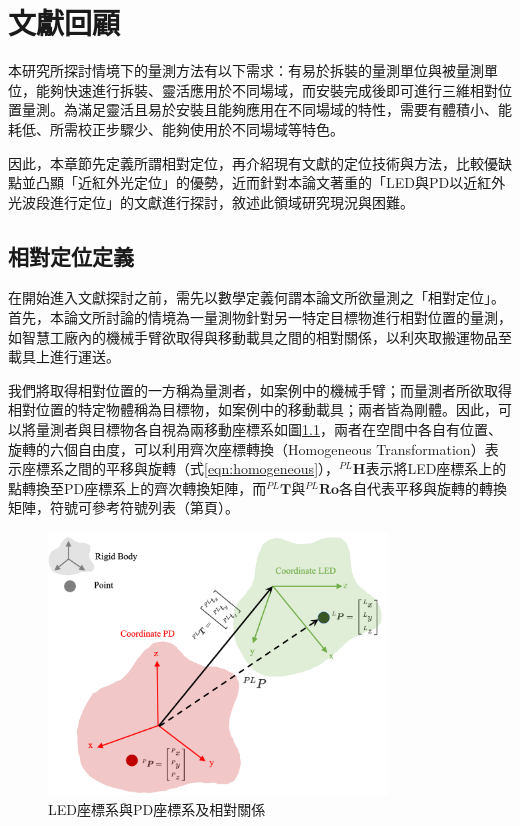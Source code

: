 \chapter{文獻回顧}







本研究所探討情境下的量測方法有以下需求：有易於拆裝的量測單位與被量測單位，能夠快速進行拆裝、靈活應用於不同場域，而安裝完成後即可進行三維相對位置量測。為滿足靈活且易於安裝且能夠應用在不同場域的特性，需要有體積小、能耗低、所需校正步驟少、能夠使用於不同場域等特色。

因此，本章節先定義所謂相對定位，再介紹現有文獻的定位技術與方法，比較優缺點並凸顯「近紅外光定位」的優勢，近而針對本論文著重的「LED與PD以近紅外光波段進行定位」的文獻進行探討，敘述此領域研究現況與困難。








\section{相對定位定義}
\label{chp:relative}
    
    在開始進入文獻探討之前，需先以數學定義何謂本論文所欲量測之「相對定位」。首先，本論文所討論的情境為一量測物針對另一特定目標物進行相對位置的量測，如智慧工廠內的機械手臂欲取得與移動載具之間的相對關係，以利夾取搬運物品至載具上進行運送。
    
    我們將取得相對位置的一方稱為量測者，如案例中的機械手臂；而量測者所欲取得相對位置的特定物體稱為目標物，如案例中的移動載具；兩者皆為剛體。因此，可以將量測者與目標物各自視為兩移動座標系如圖\ref{pic:homo_trans}，兩者在空間中各自有位置、旋轉的六個自由度，可以利用齊次座標轉換（Homogeneous Transformation）表示座標系之間的平移與旋轉（式\ref{eqn:homogeneous}），$^{PL}\boldsymbol{H}$表示將LED座標系上的點轉換至PD座標系上的齊次轉換矩陣，而$^{PL}\boldsymbol{T}$與$^{PL}\boldsymbol{Ro}$各自代表平移與旋轉的轉換矩陣，符號可參考符號列表（第\pageref{chp:symbol}頁）。
    
    \begin{figure}[ht]
        \centering
        \includegraphics[width=9cm]{ch2pic/homo_trans.png}
        \caption{LED座標系與PD座標系及相對關係}
        \label{pic:homo_trans}
    \end{figure}

